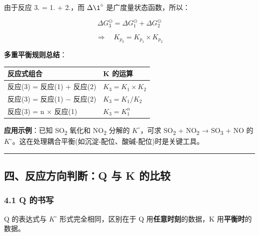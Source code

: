 \documentclass[a4paper,11pt]{ctexart}
\newcounter{none}
\begin{document}
由于反应 3. = 1. + 2.，而 \(\Delta \1^{\circ}\) 是广度量状态函数，所以：

\[
\Delta G_3^\ominus = \Delta G_1^\ominus + \Delta G_2^\ominus
\]

\[
\Rightarrow \quad \boxed{K_{p_3} = K_{p_1} \times K_{p_2}}
\]

\textbf{多重平衡规则总结}：

{\def\LTcaptype{none} %
\begin{longtable}[]{@{}ll@{}}
\toprule\noalign{}
反应式组合 & K 的运算 \\
\midrule\noalign{}
\endhead
\bottomrule\noalign{}
\endlastfoot
反应(3) = 反应(1) + 反应(2) & \(K_3 = K_1 \times K_2\) \\
反应(3) = 反应(1) − 反应(2) & \(K_3 = K_1 / K_2\) \\
反应(3) = n × 反应(1) & \(K_3 = K_1^n\) \\
\end{longtable}
}

\textbf{应用示例}：已知 SO\textsubscript{2} 氧化和 NO\textsubscript{2} 分解的 \(K^{\circ}\)，可求 SO\textsubscript{2} + NO\textsubscript{2} → SO\textsubscript{3} + NO 的 \(K^{\circ}\)。这在处理耦合平衡(如沉淀-配位、酸碱-配位)时是关键工具。

\begin{center}\rule{0.5\linewidth}{0.5pt}\end{center}

\subsection{四、反应方向判断：Q 与 K 的比较}\label{ux56dbux53cdux5e94ux65b9ux5411ux5224ux65adq-ux4e0e-k-ux7684ux6bd4ux8f83}

\subsubsection{4.1 Q 的书写}\label{q-ux7684ux4e66ux5199}

Q 的表达式与 \(K^{\circ}\) 形式完全相同，区别在于 Q 用\textbf{任意时刻}的数据，K 用\textbf{平衡时}的数据。
\end{document}

